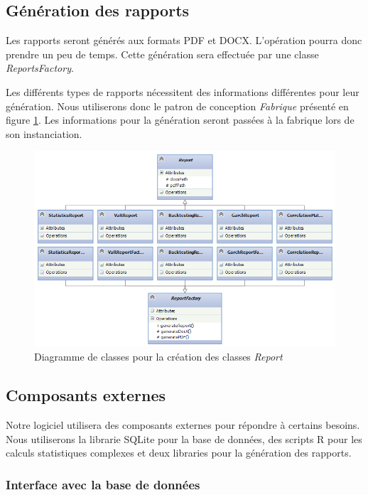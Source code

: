 \documentclass[a4paper]{report}
\begin{document}
\subsection{Génération des rapports}

Les rapports seront générés aux formats PDF et DOCX.
L'opération pourra donc prendre un peu de temps.
Cette génération sera effectuée par une classe \textit{ReportsFactory}.

Les différents types de rapports nécessitent des informations différentes pour leur génération.
Nous utiliserons donc le patron de conception \textit{Fabrique} présenté en figure \ref{fig:diagramme-classes-reports-factory}.
Les informations pour la génération seront passées à la fabrique lors de son instanciation.

\begin{figure}
  	\center
  	\includegraphics[width=1\textwidth]{diagramme-classes-reports-factory.png}
  	\caption{Diagramme de classes pour la création des classes \textit{Report}}
  	\label{fig:diagramme-classes-reports-factory}
\end{figure}


\subsection{Composants externes}

Notre logiciel utilisera des composants externes pour répondre à certains besoins.
Nous utiliserons la librarie SQLite pour la base de données, des scripts R pour les calculs statistiques complexes et deux libraries pour la génération des rapports.

\subsubsection{Interface avec la base de données}
\end{document}
